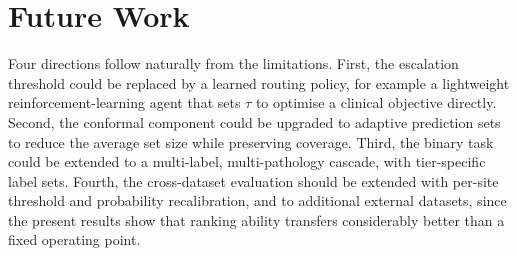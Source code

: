 \section{Future Work}
Four directions follow naturally from the limitations. First, the escalation threshold could be replaced by a learned routing policy, for example a lightweight reinforcement-learning agent that sets $\tau$ to optimise a clinical objective directly. Second, the conformal component could be upgraded to adaptive prediction sets to reduce the average set size while preserving coverage. Third, the binary task could be extended to a multi-label, multi-pathology cascade, with tier-specific label sets. Fourth, the cross-dataset evaluation should be extended with per-site threshold and probability recalibration, and to additional external datasets, since the present results show that ranking ability transfers considerably better than a fixed operating point.
